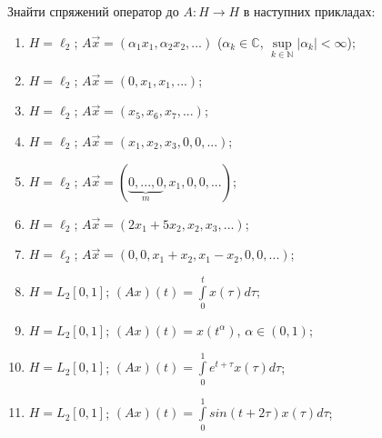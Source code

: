 \begin{exercise}
    Знайти спряжений оператор до $A: H\rightarrow H$ в наступних 
    прикладах:
    \begin{enumerate}[label=\ukr*)]
        \item $H = \ell_2$; $A\vec{x} = (\alpha_1x_1, \alpha_2x_2, ...)$
        ($\alpha_k \in \mathbb{C}$, $\underset{k \in \mathbb{N}}{\sup}|\alpha_k| < \infty$);
        \item $H = \ell_2$; $A\vec{x} = (0, x_1, x_1, ...)$;
        \item $H = \ell_2$; $A\vec{x} = (x_5, x_6, x_7, ...)$;
        \item $H = \ell_2$; $A\vec{x} = (x_1, x_2, x_3,0,0,...)$;
        \item $H = \ell_2$; $A\vec{x} = (\underbrace{0,...,0}_m, 
        x_1, 0, 0, ...)$;
        \item $H = \ell_2$; $A\vec{x} = (2x_1 + 5x_2, x_2, x_3, ...)$;
        \item $H = \ell_2$; $A\vec{x} = (0, 0, x_1 + x_2, x_1 - x_2, 0,  
        0, ...)$;
        \item $H = L_2[0,1]$; $(Ax)(t) = \int\limits_0^t x(\tau) d\tau$;
        \item $H = L_2[0,1]$; $(Ax)(t) = x(t^\alpha)$, $\alpha \in (0,1)$;
        \item $H = L_2[0,1]$; $(Ax)(t) = \int\limits_0^1 e^{t+\tau}x(\tau) 
        d\tau$;
        \item $H = L_2[0,1]$; $(Ax)(t) = \int\limits_0^1 
        sin(t+2\tau) x(\tau) d\tau$;
    \end{enumerate}
\end{exercise}